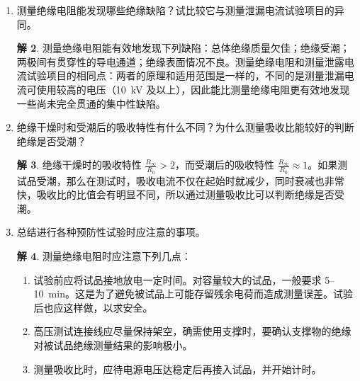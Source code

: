 \documentclass[zihao=-4,fontset = none]{ctexart}
\theoremstyle{definition}
\newtheorem*{solution}{解}
\begin{document}
\begin{enumerate}
\begin{solution}
\begin{enumerate}
      如图2-2所示，当温度很低时，由于分子间的联系紧密，液体电介质黏度很大，偶极子转动困难，所以 $\varepsilon_r$ 很小；随着温度的升高，液体电介质黏度减小，偶极子转动幅度变大，$\varepsilon_r$ 随之变大；温度继续升高，分子热运动加剧，阻碍极性分子沿电场取向，使极化减弱，$\varepsilon_r$ 又开始减小。
      \item 频率对极性液体电介质的 $\varepsilon_r$ 值的影响
      
      如图2-1所示，频率太高时偶极子来不及转动，因而 $\varepsilon_r$ 值变小。其中 $\varepsilon_{r0}$ 相当于直流电场下的介电常数，$f>f_1$ 以后偶极子越来越跟不上电场的交变，$\varepsilon_r$ 值不断下降；当频率 $f=f_2$ 时，偶极子已经完全跟不上电场转动了，这时只存在电子式极化，$\varepsilon_r$ 减小到 $\varepsilon_{r\infty}$，常温下，极性液体电介质的 $\varepsilon \approx 3 \sim 6$。
    \end{enumerate}
  \end{solution}
  \item 测量绝缘电阻能发现哪些绝缘缺陷？试比较它与测量泄漏电流试验项目的异同。
  \begin{solution}
    测量绝缘电阻能有效地发现下列缺陷：总体绝缘质量欠佳；绝缘受潮；两极间有贯穿性的导电通道；绝缘表面情况不良。测量绝缘电阻和测量泄露电流试验项目的相同点：两者的原理和适用范围是一样的，不同的是测量泄漏电流可使用较高的电压（\SI{10}{kV} 及以上），因此能比测量绝缘电阻更有效地发现一些尚未完全贯通的集中性缺陷。
  \end{solution}
  \item 绝缘干燥时和受潮后的吸收特性有什么不同？为什么测量吸收比能较好的判断绝缘是否受潮？
  \begin{solution}
    绝缘干燥时的吸收特性 $\frac{R_\infty}{R_0} > 2$，而受潮后的吸收特性 $\frac{R_\infty}{R_0} \approx 1$。如果测试品受潮，那么在测试时，吸收电流不仅在起始时就减少，同时衰减也非常快，吸收比的比值会有明显不同，所以通过测量吸收比可以判断绝缘是否受潮。
  \end{solution}
  \item 总结进行各种预防性试验时应注意的事项。
  \begin{solution}
    测量绝缘电阻时应注意下列几点：
    \begin{enumerate}
      \item 试验前应将试品接地放电一定时间。对容量较大的试品，一般要求 5--\SI{10}{min}。这是为了避免被试品上可能存留残余电荷而造成测量误差。试验后也应这样做，以求安全。
      \item 高压测试连接线应尽量保持架空，确需使用支撑时，要确认支撑物的绝缘对被试品绝缘测量结果的影响极小。
      \item 测量吸收比时，应待电源电压达稳定后再接入试品，并开始计时。

\end{enumerate}
\end{solution}
\end{enumerate}
\end{document}
